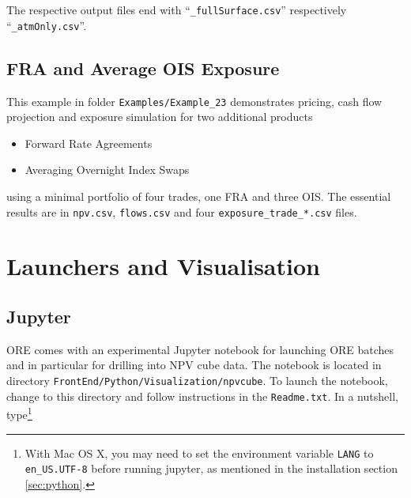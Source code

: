 \documentclass[12pt, a4paper]{article}
\begin{document}
The respective output files end with ``{\tt\_fullSurface.csv}'' respectively ``{\tt\_atmOnly.csv}''.



\subsection{FRA and Average OIS Exposure}%

This example in folder {\tt Examples/Example\_23} demonstrates pricing, cash flow projection and exposure simulation for two additional products
\begin{itemize}
\item Forward Rate Agreements
\item Averaging Overnight Index Swaps
\end{itemize}
using a minimal portfolio of four trades, one FRA and three OIS. The essential results are in {\tt npv.csv}, {\tt flows.csv} and 
four {\tt exposure\_trade\_*.csv} files.

\clearpage
\section{Launchers and Visualisation}\label{sec:visualisation}

\subsection{Jupyter}\label{sec:jupyter}

ORE comes with an experimental Jupyter notebook for launching ORE batches and in particular for drilling into NPV cube
data.  The notebook is located in directory {\tt FrontEnd/Python/Visualization/npvcube}. To launch the notebook, change
to this directory and follow instructions in the {\tt Readme.txt}. In a nutshell, type\footnote{With Mac OS X, you may
  need to set the environment variable {\tt LANG} to {\tt en\_US.UTF-8} before running jupyter, as mentioned in the
  installation section \ref{sec:python}.}
\end{document}
